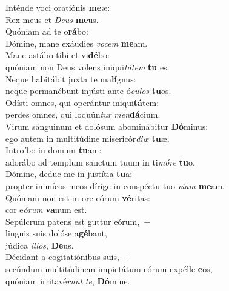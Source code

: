 \evenverse Inténde voci oratiónis \textbf{me}æ:~\*\\
\evenverse Rex meus et \textit{De}\textit{us} \textbf{me}us.\\
\oddverse Quóniam ad te o\textbf{rá}bo:~\*\\
\oddverse Dómine, mane exáudies \textit{vo}\textit{cem} \textbf{me}am.\\
\evenverse Mane astábo tibi et vi\textbf{dé}bo:~\*\\
\evenverse quóniam non Deus volens iniqui\textit{tá}\textit{tem} \textbf{tu} es.\\
\oddverse Neque habitábit juxta te ma\textbf{lí}gnus:~\*\\
\oddverse neque permanébunt injústi ante ó\textit{cu}\textit{los} \textbf{tu}os.\\
\evenverse Odísti omnes, qui operántur iniqui\textbf{tá}tem:~\*\\
\evenverse perdes omnes, qui loquún\textit{tur} \textit{men}\textbf{dá}cium.\\
\oddverse Virum sánguinum et dolósum abominábitur \textbf{Dó}minus:~\*\\
\oddverse ego autem in multitúdine misericór\textit{di}\textit{æ} \textbf{tu}æ.\\
\evenverse Introíbo in domum \textbf{tu}am:~\*\\
\evenverse adorábo ad templum sanctum tuum in ti\textit{mó}\textit{re} \textbf{tu}o.\\
\oddverse Dómine, deduc me in justítia \textbf{tu}a:~\*\\
\oddverse propter inimícos meos dírige in conspéctu tuo \textit{vi}\textit{am} \textbf{me}am.\\
\evenverse Quóniam non est in ore eórum \textbf{vé}ritas:~\*\\
\evenverse cor e\textit{ó}\textit{rum} \textbf{va}num est.\\
\oddverse Sepúlcrum patens est guttur eórum,~+\\
\oddverse  linguis suis dolóse a\textbf{gé}bant,~\*\\
\oddverse júdica \textit{il}\textit{los}, \textbf{De}us.\\
\evenverse Décidant a cogitatiónibus suis,~+\\
\evenverse  secúndum multitúdinem impietátum eórum expélle \textbf{e}os,~\*\\
\evenverse quóniam irritavé\textit{runt} \textit{te}, \textbf{Dó}mine.\\
